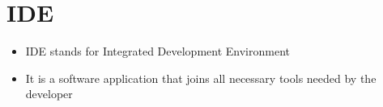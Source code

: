 \documentclass{article}
\begin{document}
	\section{IDE}
	\begin{itemize}
		\item IDE stands for Integrated  Development Environment
		\item It is a software application that joins all necessary tools needed by the developer
	\end{itemize}
\end{document}
